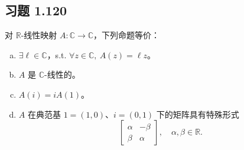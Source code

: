 \documentclass[11pt,a4paper]{article}
\theoremstyle{definition}
\begin{document}
\subsection{习题 1.120}

对 $\mathbb{R}$-线性映射 $A : \mathbb{C} \to \mathbb{C}$，下列命题等价：
\begin{enumerate}[(a)]
  \item $\exists \ell \in \mathbb{C}$，s.t. $\forall z \in \mathbb{C},\ A(z) = \ell z$。
  \item $A$ 是 $\mathbb{C}$-线性的。
  \item $A(i) = iA(1)$。
  \item $A$ 在典范基 $1 = (1, 0)$、$i = (0, 1)$ 下的矩阵具有特殊形式
    \[
      \begin{bmatrix}
        \alpha & -\beta \\
        \beta & \alpha
      \end{bmatrix}, \quad \alpha, \beta \in \mathbb{R}.
    \]
\end{enumerate}
\end{document}
